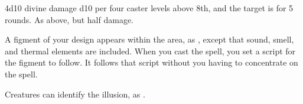 \begin{spellheader}
    \spellrng{\rngmed}
    \begin{spelltargetinginfo}
    \end{spelltargetinginfo}
    \begin{spelleffects}
    \end{spelleffects}
\end{spellheader}
\begin{spellcontent}
    \spellsuccess 4d10 divine damage \add d10 per four caster levels above 8th, and the target is \bewildered for 5 rounds.
    \spellfailure As above, but half damage.
\end{spellcontent}
\begin{spellfooter}

\end{spellfooter}

\begin{spellheader}
    \begin{spelltargetinginfo}
    \end{spelltargetinginfo}
    \begin{spelleffects}
    \end{spelleffects}
\end{spellheader}
\begin{spellcontent}
    \spelleffect A figment of your design appears within the area, as , except that sound, smell, and thermal elements are included. When you cast the spell, you set a script for the figment to follow. It follows that script without you having to concentrate on the spell.
    \spelldur{\durmed \dismissable}
\end{spellcontent}
\begin{spellfooter}
    \spellnotes Creatures can identify the illusion, as .
\end{spellfooter}

